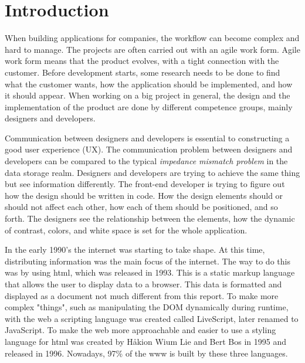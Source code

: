 \section{Introduction}



When building applications for companies, the workflow can become complex and hard to manage. The projects are often carried out with an agile work form\cite{cohen2004introduction}. Agile work form means that the product evolves, with a tight connection with the customer. Before development starts, some research needs to be done to find what the customer wants, how the application should be implemented, and how it should appear. When working on a big project in general, the design and the implementation of the product are done by different competence groups, mainly designers and developers. 

Communication between designers and developers is essential to constructing a good user experience (UX). The communication problem between designers and developers can be compared to the typical \textit{impedance mismatch problem} in the data storage realm\cite{irelandClassificationObjectRelationalImpedance2009}. Designers and developers are trying to achieve the same thing but see information differently. The front-end developer is trying to figure out how the design should be written in code. How the design elements should or should not affect each other, how each of them should be positioned, and so forth. The designers see the relationship between the elements, how the dynamic of contrast, colors, and white space is set for the whole application. 

In the early 1990's the internet was starting to take shape\cite{WebD2BriefHistory}. At this time, distributing information was the main focus of the internet. The way to do this was by using \acrfull{html}, which was released in 1993\cite{WebD2BriefHistory}. This is a static markup language that allows the user to display data to a browser. This data is formatted and displayed as a document not much different from this report. To make more complex "things", such as manipulating the DOM dynamically during runtime, with the web a scripting language was created called LiveScript, later renamed to JavaScript\cite{JavaScript2021}. To make the web more approachable and easier to use a styling language for \acrshort{html} was created by Håkion Wium Lie and Bert Bos in 1995 and released in 1996\cite{BriefHistoryCSS}. Nowadays, 97\% of the \acrlong{www} is built by these three languages\cite{JavaScript2021}.

